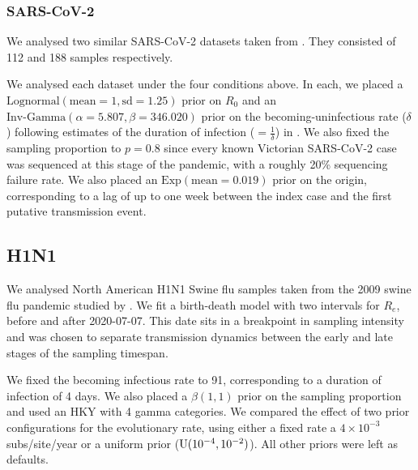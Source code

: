\documentclass{article}
\begin{document}
\subsubsection*{SARS-CoV-2}
We analysed two similar SARS-CoV-2 datasets taken from \citet{lane2021genomics}. They consisted of 112 and 188 samples respectively. 

We analysed  each dataset under the four conditions above. In each, we placed a $\textrm{Lognormal}(\textrm{mean}=1, \textrm{sd}=1.25)$ prior on $R_0$ and an $\textrm{Inv-Gamma}(\alpha=5.807, \beta=346.020)$ prior on the becoming-uninfectious rate ($\delta$) following estimates of the duration of infection ($=\frac{1}{\delta}$) in \cite{Lauer2020The}. We also fixed the sampling proportion to $p=0.8$ since every known Victorian SARS-CoV-2 case was sequenced at this stage of the pandemic, with a roughly 20\% sequencing failure rate. We also placed an $\textrm{Exp}(\textrm{mean}=0.019)$ prior on the origin, corresponding to a lag of up to one week  between the index case and the first putative transmission event.

\subsection*{H1N1}
We analysed North American H1N1 Swine flu samples taken from the 2009 swine flu pandemic studied by \citet{hedge_2013_real-time}. We fit a birth-death model with two intervals for $R_e$, before and after 2020-07-07. This date sits in a breakpoint in sampling intensity and was chosen to separate transmission dynamics between the early and late stages of the sampling timespan.

We fixed the becoming infectious rate to 91, corresponding to a duration of infection of 4 days. We also placed a $\beta(1, 1)$ prior on the sampling proportion and used an HKY with 4 gamma categories. We compared the effect of two prior configurations for the evolutionary rate, using either a fixed rate a $4\times10^{-3}$ subs/site/year or a uniform prior ($\textnormal{U}(10^{-4}, 10^{-2})$). All other priors were left as defaults.

\end{document}
